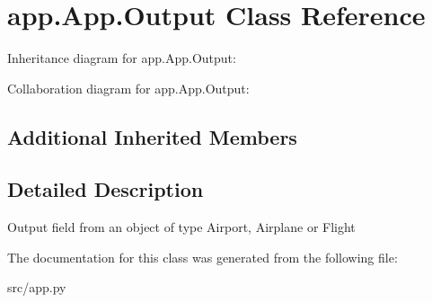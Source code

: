 \hypertarget{classapp_1_1_app_1_1_output}{}\section{app.\+App.\+Output Class Reference}
\label{classapp_1_1_app_1_1_output}


Inheritance diagram for app.\+App.\+Output\+:


Collaboration diagram for app.\+App.\+Output\+:
\subsection*{Additional Inherited Members}


\subsection{Detailed Description}
\begin{DoxyVerb}Output field from an object of type Airport, Airplane or Flight\end{DoxyVerb}
 

The documentation for this class was generated from the following file\+:\begin{DoxyCompactItemize}
\item 
src/app.\+py\end{DoxyCompactItemize}
